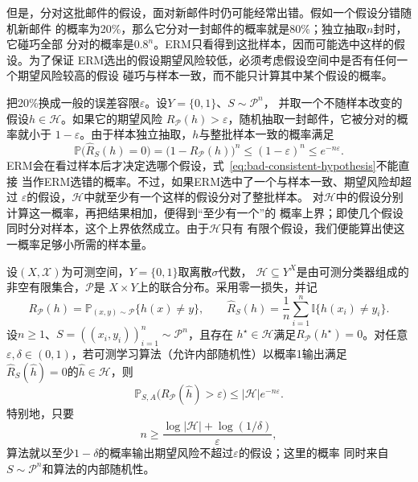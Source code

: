 但是，分对这批邮件的假设，面对新邮件时仍可能经常出错。假如一个假设分错随机新邮件
的概率为20\%，那么它分对一封邮件的概率就是80\%；独立抽取$n$封时，它碰巧全部
分对的概率是$0.8^n$。ERM只看得到这批样本，因而可能选中这样的假设。为了保证
ERM选出的假设期望风险较低，必须考虑假设空间中是否有任何一个期望风险较高的假设
碰巧与样本一致，而不能只计算其中某个假设的概率。

把20\%换成一般的误差容限$\varepsilon$。设$Y=\{0,1\}$、$S\sim\mathcal P^n$，
并取一个不随样本改变的假设$h\in\mathcal H$。如果它的期望风险
$R_{\mathcal P}(h)>\varepsilon$，随机抽取一封邮件，它被分对的概率就小于
$1-\varepsilon$。由于样本独立抽取，$h$与整批样本一致的概率满足
\begin{equation}
  \mathbb P\bigl(\hat R_S(h)=0\bigr)
  =\bigl(1-R_{\mathcal P}(h)\bigr)^n
  \leq(1-\varepsilon)^n\leq e^{-n\varepsilon}.
  \label{eq:bad-consistent-hypothesis}
\end{equation}
ERM会在看过样本后才决定选哪个假设，式~\eqref{eq:bad-consistent-hypothesis}不能直接
当作ERM选错的概率。不过，如果ERM选中了一个与样本一致、期望风险却超过
$\varepsilon$的假设，$\mathcal H$中就至少有一个这样的假设分对了整批样本。
对$\mathcal H$中的假设分别计算这一概率，再把结果相加，便得到“至少有一个”的
概率上界；即使几个假设同时分对样本，这个上界依然成立。由于$\mathcal H$只有
有限个假设，我们便能算出使这一概率足够小所需的样本量。

\begin{theorem}[有限假设空间的可实现PAC样本量界]
\label{thm:finite-realizable-pac}
设$(X,\mathcal X)$为可测空间，$Y=\{0,1\}$取离散$\sigma$代数，
$\mathcal H\subseteq Y^X$是由可测分类器组成的非空有限集合，$\mathcal P$是
$X\times Y$上的联合分布。采用零一损失，并记
\[
 R_{\mathcal P}(h)=\mathbb P_{(x,y)\sim\mathcal P}\{h(x)\neq y\},\qquad
 \hat R_S(h)=\frac1n\sum_{i=1}^n\mathbb I\{h(x_i)\neq y_i\}.
\]
设$n\geq1$、$S=((x_i,y_i))_{i=1}^n\sim\mathcal P^n$，且存在
$h^\star\in\mathcal H$满足$R_{\mathcal P}(h^\star)=0$。对任意
$\varepsilon,\delta\in(0,1)$，若可测学习算法（允许内部随机性）以概率1输出满足
$\hat R_S(\hat h)=0$的$\hat h\in\mathcal H$，则
\begin{equation}
  \mathbb P_{S,A}\bigl(R_{\mathcal P}(\hat h)>\varepsilon\bigr)
  \leq |\mathcal H|e^{-n\varepsilon}.
  \label{eq:finite-realizable-failure}
\end{equation}
特别地，只要
\begin{equation}
  n\geq\frac{\log|\mathcal H|+\log(1/\delta)}{\varepsilon},
  \label{eq:finite-realizable-sample}
\end{equation}
算法就以至少$1-\delta$的概率输出期望风险不超过$\varepsilon$的假设；这里的概率
同时来自$S\sim\mathcal P^n$和算法的内部随机性。
\end{theorem}

